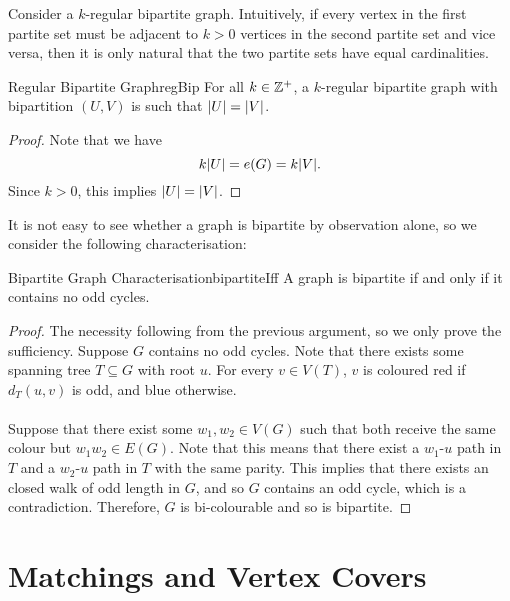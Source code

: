 \documentclass[math, code]{amznotes}
\theoremstyle{remark}
\begin{document}
Consider a $k$-regular bipartite graph. Intuitively, if every vertex in the first partite set must be adjacent to $k > 0$ vertices in the second partite set and vice versa, then it is only natural that the two partite sets have equal cardinalities.
\begin{probox}{Regular Bipartite Graph}{regBip}
    For all $k \in \mathbb{Z}^+$, a $k$-regular bipartite graph with bipartition $(U, V)$ is such that ${\left\lvert {U} \right\rvert} = {\left\lvert {V} \right\rvert}$.
    \tcblower
    \begin{proof}
        Note that we have
        \begin{equation*}
            k{\left\lvert {U} \right\rvert} = e(G) = k{\left\lvert {V} \right\rvert}.
        \end{equation*}
        Since $k > 0$, this implies ${\left\lvert {U} \right\rvert} = {\left\lvert {V} \right\rvert}$.
    \end{proof}
\end{probox}
It is not easy to see whether a graph is bipartite by observation alone, so we consider the following characterisation:
\begin{thmbox}{Bipartite Graph Characterisation}{bipartiteIff}
    A graph is bipartite if and only if it contains no odd cycles.
    \tcblower
    \begin{proof}
        The necessity following from the previous argument, so we only prove the sufficiency. Suppose $G$ contains no odd cycles. Note that there exists some spanning tree $T \subseteq G$ with root $u$. For every $v \in V(T)$, $v$ is coloured red if $d_T(u, v)$ is odd, and blue otherwise.
        \\\\
        Suppose that there exist some $w_1, w_2 \in V(G)$ such that both receive the same colour but $w_1w_2 \in E(G)$. Note that this means that there exist a $w_1$-$u$ path in $T$ and a $w_2$-$u$ path in $T$ with the same parity. This implies that there exists an closed walk of odd length in $G$, and so $G$ contains an odd cycle, which is a contradiction. Therefore, $G$ is bi-colourable and so is bipartite.
    \end{proof}
\end{thmbox}

\chapter{Matchings and Vertex Covers}
\end{document}
